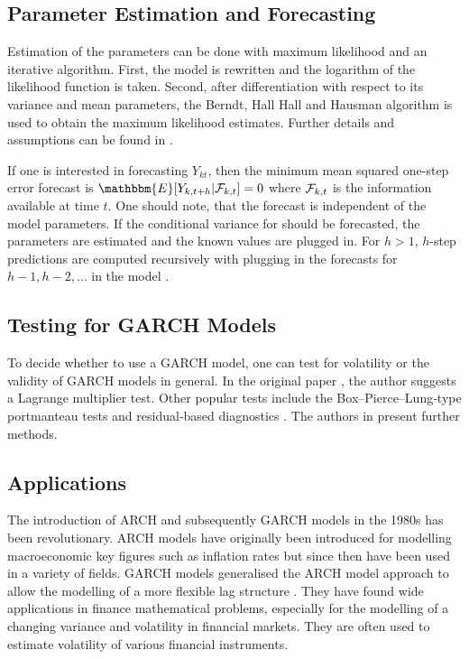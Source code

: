 \subsection{Parameter Estimation and Forecasting}
\label{sec: GARCH Parameter Estimation and Forecasting}

Estimation of the parameters can be done with maximum likelihood and an iterative algorithm. First, the model is rewritten and the logarithm of the likelihood function is taken. Second, after differentiation with respect to its variance and mean parameters, the Berndt, Hall Hall and Hausman algorithm \cite{Berndt:1974}is used to obtain the maximum likelihood estimates. Further details and assumptions can be found in \cite{Bollerslev:1986}. 

If one is interested in forecasting $Y_{kt}$, then the minimum mean squared one-step error forecast is $\mathbbm{E}[Y_{k,t+h}|\SigA_{k,t}]=0$ where $\mathcal{F}_{k,t}$ is the information available at time $t$. One should note, that the forecast is independent of the model parameters. If the conditional variance for should be forecasted, the parameters are estimated and the known values are plugged in. For $h>1$, $h$-step predictions are computed recursively with plugging in the forecasts for $h-1,h-2,\ldots$ in the model \cite{Zivot:2009}. 


\subsection{Testing for GARCH Models}
\label{sec: Testing for GARCH models}

To decide whether to use a GARCH model, one can test for volatility or the validity of GARCH models in general. In the original paper \cite{Bollerslev:1986}, the author suggests a Lagrange multiplier test. Other popular tests include the Box–Pierce–Lung‐type portmanteau tests and residual‐based diagnostics \cite{Hong:2017}. The authors in \cite{Hong:2017} present further methods. 


\subsection{Applications}
\label{sec: Garch Applications}

The introduction of ARCH and subsequently GARCH models in the 1980s has been revolutionary. ARCH models have originally been introduced for modelling macroeconomic key figures such as inflation rates but since then have been used in a variety of fields. GARCH models generalised the ARCH model approach to allow the modelling of a more flexible lag structure \cite{Bollerslev:1986}. They have found wide applications in finance mathematical problems, especially for the modelling of a changing variance and volatility in financial markets. They are often used to estimate volatility of various financial instruments. 

